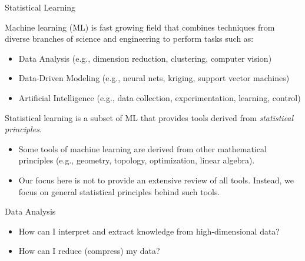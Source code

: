 \documentclass[9pt]{beamer}
\begin{document}
%
\begin{frame}{Statistical Learning}

\begin{block}{}
Machine learning (ML) is fast growing field that combines techniques from diverse branches of science and engineering to perform tasks such as:
\end{block}
\begin{itemize}
\setlength{\itemsep}{10pt}
\item Data Analysis (e.g., dimension reduction, clustering, computer vision)
\item Data-Driven Modeling (e.g., neural nets, kriging, support vector machines)
\item Artificial Intelligence (e.g., data collection, experimentation, learning, control)
\end{itemize}
\begin{block}{}
Statistical learning is a subset of ML that provides tools derived from {\em statistical principles}. 
\end{block}
\begin{itemize}
\setlength{\itemsep}{10pt}
\item Some tools of machine learning are derived from other mathematical principles (e.g., geometry, topology, optimization, linear algebra). 
\item Our focus here is not to provide an extensive review of all tools. Instead, we focus on general statistical principles behind such tools.  
\end{itemize}
\end{frame}


%
\begin{frame}{Data Analysis}

\begin{block}{}
\begin{itemize}
\setlength{\itemsep}{10pt}
\item How can I interpret and extract knowledge from high-dimensional data? 

\item How can I reduce (compress) my data? 
\end{itemize}
\end{block}

\end{frame}
\end{document}
